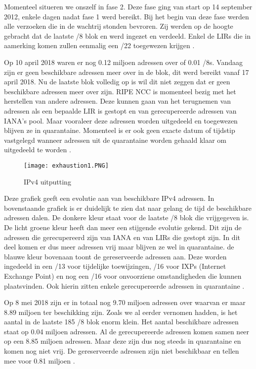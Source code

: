 Momenteel situeren we onszelf in fase 2. Deze fase ging van start op 14 september 2012, enkele dagen nadat fase 1 werd bereikt. Bij het begin van deze fase werden alle verzoeken die in de wachtrij stonden bevroren. Zij werden op de hoogte gebracht dat de laatste /8 blok en werd ingezet en verdeeld. Enkel de LIRs die in aamerking komen zullen eenmalig een /22 toegewezen krijgen \autocite{RIPE2016Fases}.

Op 10 april 2018 waren er nog 0.12 miljoen adressen over of 0.01 /8s. Vandaag zijn er geen beschikbare adressen meer over in de blok, dit werd bereikt vanaf 17 april 2018. Nu de laatste blok volledig op is wil dit niet zeggen dat er geen beschikbare adressen meer over zijn. RIPE NCC is momenteel bezig met het herstellen van andere adressen. Deze kunnen gaan van het terugnemen van adressen als een bepaalde LIR is gestopt en van gerecupereerde adressen van IANA’s pool. Maar vooraleer deze adressen worden uitgedeeld en toegewezen blijven ze in quarantaine. Momenteel is er ook geen exacte datum of tijdstip vastgelegd wanneer adressen uit de quarantaine worden gehaald klaar om uitgedeeld te worden  \autocite{RIPE2014}. 

\begin{figure}
\centering
\texttt{[image: exhaustion1.PNG]}
\caption{IPv4 uitputting \autocite{RIPE2014}}
\end{figure}

Deze grafiek geeft een evolutie aan van beschikbare IPv4 adressen. In bovenstaande grafiek is er duidelijk te zien dat naar gelang de tijd de beschikbare adressen dalen. De donkere kleur staat voor de laatste /8 blok die vrijgegeven is. De licht groene kleur heeft dan meer een stijgende evolutie gekend. Dit zijn de adressen die gerecupereerd zijn van IANA en van LIRs die gestopt zijn. In dit deel komen er dus meer adressen vrij maar blijven ze wel in quarantaine. de blauwe kleur bovenaan toont de gereserveerde adressen aan. Deze worden ingedeeld in een /13 voor tijdelijke toewijzingen, /16 voor IXPs (Internet Exchange Point) en nog een /16 voor onvoorziene omstandigheden die kunnen plaatsvinden. Ook hierin zitten enkele gerecupereerde adressen in quarantaine  \autocite{RIPE2014}.

Op 8 mei 2018 zijn er in totaal nog 9.70 miljoen adressen over waarvan er maar 8.89 miljoen ter beschikking zijn. Zoals we al eerder vernomen hadden, is het aantal in de laatste 185 /8 blok enorm klein. Het aantal beschikbare adressen staat op 0.04 miljoen adressen. Al de gerecupereerde adressen komen samen neer op een 8.85 miljoen adressen. Maar deze zijn dus nog steeds in quarantaine en komen nog niet vrij. De gereserveerde adressen zijn niet beschikbaar en tellen mee voor 0.81 miljoen \autocite{RIPE2014}.

